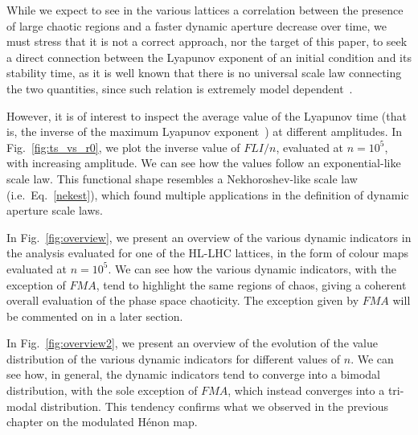 While we expect to see in the various lattices a correlation between the presence of large chaotic regions and a faster dynamic aperture decrease over time, we must stress that it is not a correct approach, nor the target of this paper, to seek a direct connection between the Lyapunov exponent of an initial condition and its stability time, as it is well known that there is no universal scale law connecting the two quantities, since such relation is extremely model dependent~\cite{Morbidelli1995}.

However, it is of interest to inspect the average value of the Lyapunov time (that is, the inverse of the maximum Lyapunov exponent~\cite{Tancredi_2001}) at different amplitudes. In Fig.~\ref{fig:ts_vs_r0}, we plot the inverse value of $FLI/n$, evaluated at $n=10^5$, with increasing amplitude. We can see how the values follow an exponential-like scale law. This functional shape resembles a Nekhoroshev-like scale law (i.e.\ Eq.~\eqref{nekest}), which found multiple applications in the definition of dynamic aperture scale laws.

In Fig.~\ref{fig:overview}, we present an overview of the various dynamic indicators in the analysis evaluated for one of the HL-LHC lattices, in the form of colour maps evaluated at $n=10^5$. We can see how the various dynamic indicators, with the exception of $FMA$, tend to highlight the same regions of chaos, giving a coherent overall evaluation of the phase space chaoticity. The exception given by $FMA$ will be commented on in a later section. 

In Fig.~\ref{fig:overview2}, we present an overview of the evolution of the value distribution of the various dynamic indicators for different values of $n$. We can see how, in general, the dynamic indicators tend to converge into a bimodal distribution, with the sole exception of $FMA$, which instead converges into a tri-modal distribution. This tendency confirms what we observed in the previous chapter on the modulated Hénon map.

